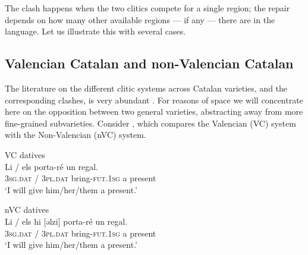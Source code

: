 \documentclass[output=paper,modfonts,nonflat,newtxmath,colorlinks,citecolor=brown]{langsci/langscibook}
\begin{document}
          

  

The clash happens when the two clitics compete for a single region; the repair depends on how many other available regions — if any — there are in the language. Let us illustrate this with several cases.

\subsection{Valencian Catalan and non-Valencian Catalan} %
\label{sec:cabre:3.1}

The literature on the different clitic systems across Catalan varieties, and the corresponding clashes, is very abundant \citep{Bonet1993, Martin2012}. For reasons of space we will concentrate here on the opposition between two general varieties, abstracting away from more fine-grained subvarieties. Consider , which compares the Valencian (VC) system with the Non-Valencian (nVC) system.

\ea%
    \label{ex:cabre:9}
    \ea VC datives \\
    \gll Li / els porta-ré un regal.\\
        \textsc{3sg}.\textsc{dat} / \textsc{3pl.dat} bring-\textsc{fut.1sg} a present\\
    \glt ‘I will give him/her/them a present.’
    
    \ex nVC datives\\
    \gll Li / {els hi [ǝlzi]} porta-ré  un regal.\\
    \textsc{3sg.dat} / \textsc{3pl.dat} bring-\textsc{fut.1sg} a present\\
    \glt ‘I will give him/her/them a present.’
    \z
    \z
\end{document}
